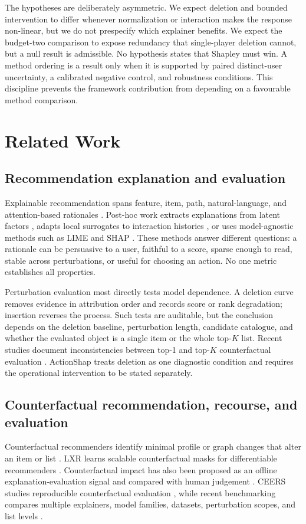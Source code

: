 \documentclass[11pt]{article}
\begin{document}
The hypotheses are deliberately asymmetric. We expect deletion and bounded intervention to differ whenever normalization or interaction makes the response non-linear, but we do not prespecify which explainer benefits. We expect the budget-two comparison to expose redundancy that single-player deletion cannot, but a null result is admissible. No hypothesis states that Shapley must win. A method ordering is a result only when it is supported by paired distinct-user uncertainty, a calibrated negative control, and robustness conditions. This discipline prevents the framework contribution from depending on a favourable method comparison.

\section{Related Work}
\subsection{Recommendation explanation and evaluation}
Explainable recommendation spans feature, item, path, natural-language, and attention-based rationales \citep{zhang2020survey}. Post-hoc work extracts explanations from latent factors \citep{peake2018}, adapts local surrogates to interaction histories \citep{nobrega2019}, or uses model-agnostic methods such as LIME \citep{ribeiro2016} and SHAP \citep{lundberg2017}. These methods answer different questions: a rationale can be persuasive to a user, faithful to a score, sparse enough to read, stable across perturbations, or useful for choosing an action. No one metric establishes all properties.

Perturbation evaluation most directly tests model dependence. A deletion curve removes evidence in attribution order and records score or rank degradation; insertion reverses the process. Such tests are auditable, but the conclusion depends on the deletion baseline, perturbation length, candidate catalogue, and whether the evaluated object is a single item or the whole top-$K$ list. Recent studies document inconsistencies between top-1 and top-$K$ counterfactual evaluation \citep{mohammadi2025}. ActionShap treats deletion as one diagnostic condition and requires the operational intervention to be stated separately.

\subsection{Counterfactual recommendation, recourse, and evaluation}
Counterfactual recommenders identify minimal profile or graph changes that alter an item or list \citep{ghazimatin2020,tran2021,tan2021}. LXR learns scalable counterfactual masks for differentiable recommenders \citep{barkan2024,gurevitch2025}. Counterfactual impact has also been proposed as an offline explanation-evaluation signal and compared with human judgement \citep{yao2022}. CEERS studies reproducible counterfactual evaluation \citep{baklanov2024}, while recent benchmarking compares multiple explainers, model families, datasets, perturbation scopes, and list levels \citep{nguyen2026}.
\end{document}
